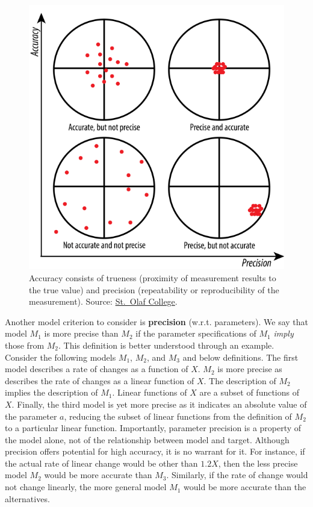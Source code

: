 \documentclass[
]{book}
\begin{document}
\begin{figure}

{\centering \includegraphics[width=0.66\linewidth]{Figures/prec_vs_acc} 

}

\caption{Accuracy consists of trueness (proximity of measurement results to the true value) and precision (repeatability or reproducibility of the measurement). Source: \href{https://wp.stolaf.edu/it/gis-precision-accuracy/}{St.~Olaf College}.}\label{fig:prec-vs-acc}
\end{figure}

Another model criterion to consider is \textbf{precision} (w.r.t. parameters). We say that model \(M_1\) is more precise than \(M_2\) if the parameter specifications of \(M_1\) \emph{imply} those from \(M_2\). This definition is better understood through an example. Consider the following models \(M_1\), \(M_2\), and \(M_3\) and below definitions. The first model describes a rate of changes as a function of \(X\). \(M_2\) is more precise as describes the rate of changes as a linear function of \(X\). The description of \(M_2\) implies the description of \(M_1\). Linear functions of \(X\) are a subset of functions of \(X\). Finally, the third model is yet more precise as it indicates an absolute value of the parameter \(a\), reducing the subset of linear functions from the definition of \(M_2\) to a particular linear function. Importantly, parameter precision is a property of the model alone, not of the relationship between model and target. Although precision offers potential for high accuracy, it is no warrant for it. For instance, if the actual rate of linear change would be other than \(1.2X\), then the less precise model \(M_2\) would be more accurate than \(M_3\). Similarly, if the rate of change would not change linearly, the more general model \(M_1\) would be more accurate than the alternatives.
\end{document}
